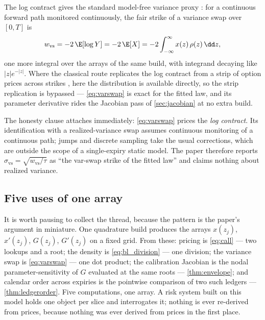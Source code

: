 The log contract gives the standard model-free variance proxy
\citep{Neuberger1994,DemeterfiDermanKamalZou1999,CarrMadan1998}: for a
continuous forward path monitored continuously, the fair strike of a
variance swap over $[0,T]$ is
\begin{equation}
w_{\mathrm{vs}}
=-2\,\E[\log Y]
=-2\,\E[X]
=-2\int_{-\infty}^{\infty}x(z)\,\rho(z)\,\dd z ,
\label{eq:varswap}
\end{equation}
one more integral over the arrays of the same build, with integrand
decaying like $|z|e^{-|z|}$.  Where the classical route replicates the log
contract from a strip of option prices across strikes
\citep{DemeterfiDermanKamalZou1999}, here the distribution is available
directly, so the strip replication is bypassed --- \eqref{eq:varswap} is
exact for the fitted law, and its parameter derivative rides the
Jacobian pass of \cref{sec:jacobian} at no extra build.

The honesty clause attaches immediately: \eqref{eq:varswap} prices the
\emph{log contract}.  Its identification with a realized-variance swap
assumes continuous monitoring of a continuous path; jumps and discrete
sampling take the usual corrections, which are outside the scope of a
single-expiry static model.  The paper therefore reports
$\sigma_{\mathrm{vs}}=\sqrt{w_{\mathrm{vs}}/\tau}$ as ``the var-swap
strike of the fitted law'' and claims nothing about realized variance.

\subsection{Five uses of one array}

It is worth pausing to collect the thread, because the pattern is the
paper's argument in miniature.  One quadrature build produces the arrays
$x(z_j)$, $x'(z_j)$, $G(z_j)$, $G'(z_j)$ on a fixed grid.  From these:
pricing is \eqref{eq:call} --- two lookups and a root; the density is
\eqref{eq:bl_division} --- one division; the variance swap is
\eqref{eq:varswap} --- one dot product; the calibration Jacobian is the
nodal parameter-sensitivity of $G$ evaluated at the same roots ---
\cref{thm:envelope}; and calendar order across expiries is the pointwise
comparison of two such ledgers --- \cref{thm:ledgerorder}.  Five
computations, one array.  A risk system built on this model holds one
object per slice and interrogates it; nothing is ever re-derived from
prices, because nothing was ever derived from prices in the first place.
